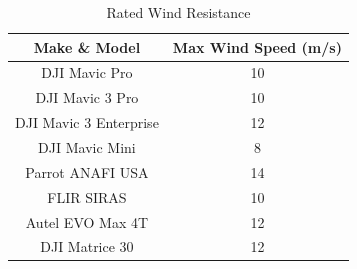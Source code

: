 \documentclass{article}
\begin{document}
\begin{table}[H]
    \centering
    \caption{Rated Wind Resistance}
    \begin{tabular}{| c | c |}
        \hline
        {Make \& Model} & Max Wind Speed (m/s) \\
        \hline
        DJI Mavic Pro & 10 \\
        DJI Mavic 3 Pro & 10 \\
        DJI Mavic 3 Enterprise & 12 \\
        DJI Mavic Mini & 8 \\
        Parrot ANAFI USA & 14 \\
        FLIR SIRAS & 10 \\
        Autel EVO Max 4T & 12 \\
        DJI Matrice 30 & 12 \\
        \hline
    \end{tabular}
    \label{tab:wind}
\end{table}



\printbibliography[heading=none]
\end{document}
